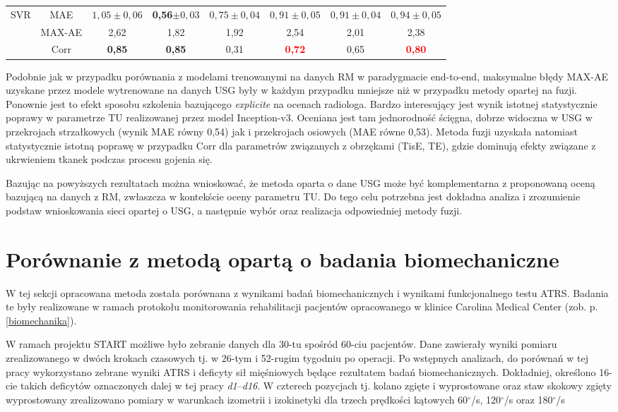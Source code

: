 \begin{table}[h]
\begin{tabular}{lc||c|c|c|c|c|c}
		SVR & MAE & $1,05\pm0,06$ & \textbf{0,56}$\pm0,03$ & $0,75\pm0,04$ & $0,91\pm0,05$ & $0,91\pm0,04$ & $0,94\pm0,05$\\
		& MAX-AE & 2,62 & 1,82 & 1,92 & 2,54 & 2,01 & 2,38 \\
		& Corr   & \textbf{0,85} & \textbf{0,85} & 0,31 & \textcolor{red}{\textbf{0,72}} & 0,65 & \textcolor{red}{\textbf{0,80}} \\
		 
	\end{tabular}
\end{table}
\renewcommand{\arraystretch}{1}

Podobnie jak w przypadku porównania z modelami trenowanymi na danych RM w paradygmacie end-to-end, maksymalne błędy MAX-AE uzyskane przez modele wytrenowane na danych USG były w każdym przypadku mniejsze niż w przypadku metody opartej na fuzji. Ponownie jest to efekt sposobu szkolenia bazującego \textit{explicite} na ocenach radiologa. Bardzo interesujący jest wynik istotnej statystycznie poprawy w parametrze TU realizowanej przez model Inception-v3. Oceniana jest tam jednorodność ścięgna, dobrze widoczna w USG w przekrojach strzałkowych (wynik MAE równy 0,54) jak i przekrojach osiowych (MAE równe 0,53). Metoda fuzji uzyskała natomiast statystycznie istotną poprawę w przypadku Corr dla parametrów związanych z obrzękami (TisE, TE), gdzie dominują efekty związane z ukrwieniem tkanek podczas procesu gojenia się.

Bazując na powyższych rezultatach można wnioskować, że metoda oparta o dane USG może być komplementarna z proponowaną oceną bazującą na danych \linebreak z RM, zwłaszcza w kontekście oceny parametru TU. Do tego celu potrzebna jest dokładna analiza i zrozumienie podstaw wnioskowania sieci opartej o USG, a następnie wybór oraz realizacja odpowiedniej metody fuzji.

\section{Porównanie z metodą opartą o badania biomechaniczne}
\label{seq:comp-biomechanics}
W tej sekcji opracowana metoda została porównana z wynikami badań biomechanicznych i wynikami funkcjonalnego testu ATRS. Badania te były realizowane w ramach protokołu monitorowania rehabilitacji pacjentów opracowanego w klinice Carolina Medical Center (zob. p. \ref{biomechanika}). 

W ramach projektu START możliwe było zebranie danych dla 30-tu spośród 60-ciu pacjentów. Dane zawierały wyniki pomiaru zrealizowanego w dwóch krokach czasowych tj. w 26-tym i 52-rugim tygodniu po operacji. Po wstępnych analizach, do porównań w tej pracy wykorzystano zebrane wyniki ATRS i deficyty sił mięśniowych będące rezultatem badań biomechanicznych. Dokładniej, określono 16-cie takich deficytów oznaczonych dalej w tej pracy \textit{d1}--\textit{d16}. W czterech pozycjach tj. kolano zgięte i wyprostowane oraz staw skokowy zgięty wyprostowany zrealizowano pomiary w warunkach izometrii i izokinetyki dla trzech prędkości kątowych 60$^\circ$/s, 120$^\circ$/s oraz 180$^\circ$/s  

